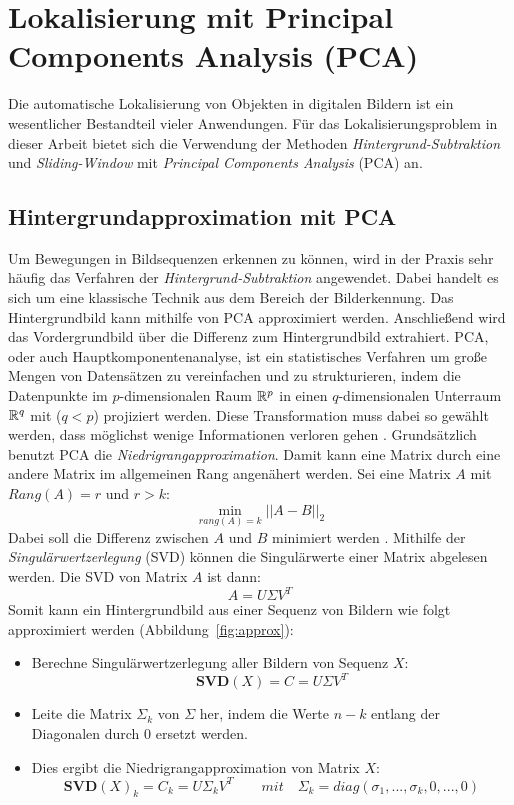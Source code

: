 \section{ Lokalisierung mit Principal Components Analysis (PCA)} \label{sec:PCA}
Die automatische Lokalisierung von Objekten in digitalen Bildern ist ein wesentlicher Bestandteil vieler Anwendungen. 
Für das Lokalisierungsproblem in dieser Arbeit bietet sich die Verwendung der Methoden \textit{Hintergrund-Subtraktion} und \textit{Sliding-Window} mit \emph{Principal Components Analysis} (PCA) an.

\subsection{Hintergrundapproximation mit PCA}
Um Bewegungen in Bildsequenzen erkennen zu können, wird in der Praxis sehr häufig das Verfahren der \textit{Hintergrund-Subtraktion} angewendet. Dabei handelt es sich um eine klassische Technik aus dem Bereich der Bilderkennung. Das Hintergrundbild kann mithilfe von PCA approximiert werden. Anschließend wird das Vordergrundbild über die Differenz zum Hintergrundbild extrahiert. PCA, oder auch Hauptkomponentenanalyse, ist ein statistisches Verfahren um große Mengen von Datensätzen zu vereinfachen und zu strukturieren, indem die Datenpunkte im $p$-dimensionalen Raum $\mathbb{R}^p$ in einen $q$-dimensionalen Unterraum $\mathbb{R}^{q}$ mit ($q<p$) projiziert werden. Diese Transformation muss dabei so gewählt werden, dass möglichst wenige Informationen verloren gehen \cite{Verbeke2007APT}.
Grundsätzlich benutzt PCA die \textit{Niedrigrangapproximation}. Damit kann eine Matrix durch eine andere Matrix im allgemeinen Rang angenähert werden. Sei eine Matrix $A$ mit $Rang(A) = r$ und $r > k$:
\begin{equation}
\min_{rang(A)=k}||A-B||_2 
\end{equation}
Dabei soll die Differenz zwischen $A$ und $B$ minimiert werden \cite{MARKOVSKY2008891}. Mithilfe der \textit{Singulärwertzerlegung} (SVD) können die Singulärwerte einer Matrix abgelesen werden. Die SVD von Matrix $A$ ist dann:
\begin{equation}
A = U \Sigma V^T
\end{equation}
Somit kann ein Hintergrundbild aus einer Sequenz von Bildern wie folgt approximiert werden (Abbildung~\ref{fig:approx}):
\begin{itemize}
\item{Berechne Singulärwertzerlegung aller Bildern von Sequenz $X$:}
\begin{equation}
\mathbf{SVD}(X)= C = U \Sigma V^T
\end{equation}
\item{Leite die Matrix ${\Sigma_k}$ von ${\Sigma}$ her, indem die Werte ${n - k}$  entlang der Diagonalen durch 0 ersetzt werden.}
\item{Dies ergibt die Niedrigrangapproximation von Matrix $X$:}
\begin{equation}
\mathbf{SVD}(X)_k=C_k = U\Sigma_kV^T \quad\quad mit  \quad  \Sigma_k = diag(\sigma_1, ..., \sigma_k,0,...,0)
\end{equation}
\end{itemize}

